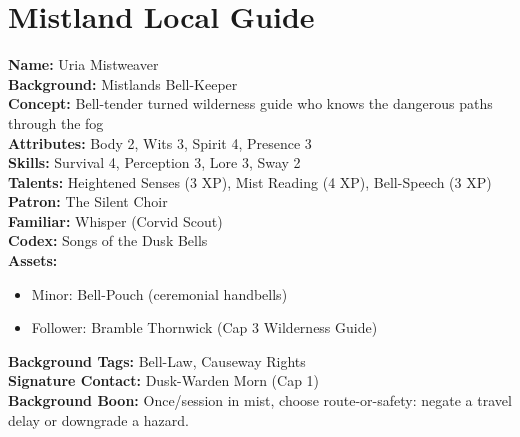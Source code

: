 \documentclass[11pt]{article}
\begin{document}
\section{Mistland Local Guide}
\textbf{Name:} Uria Mistweaver \\
\textbf{Background:} Mistlands Bell-Keeper \\
\textbf{Concept:} Bell-tender turned wilderness guide who knows the dangerous paths through the fog \\
\textbf{Attributes:} Body 2, Wits 3, Spirit 4, Presence 3 \\
\textbf{Skills:} Survival 4, Perception 3, Lore 3, Sway 2 \\
\textbf{Talents:} Heightened Senses (3 XP), Mist Reading (4 XP), Bell-Speech (3 XP) \\
\textbf{Patron:} The Silent Choir \\
\textbf{Familiar:} Whisper (Corvid Scout) \\
\textbf{Codex:} Songs of the Dusk Bells \\
\textbf{Assets:}
\begin{itemize}
    \item Minor: Bell-Pouch (ceremonial handbells)
    \item Follower: Bramble Thornwick (Cap 3 Wilderness Guide)
\end{itemize}
\textbf{Background Tags:} Bell-Law, Causeway Rights \\
\textbf{Signature Contact:} Dusk-Warden Morn (Cap 1) \\
\textbf{Background Boon:} Once/session in mist, choose route-or-safety: negate a travel delay or downgrade a hazard.
\end{document}
